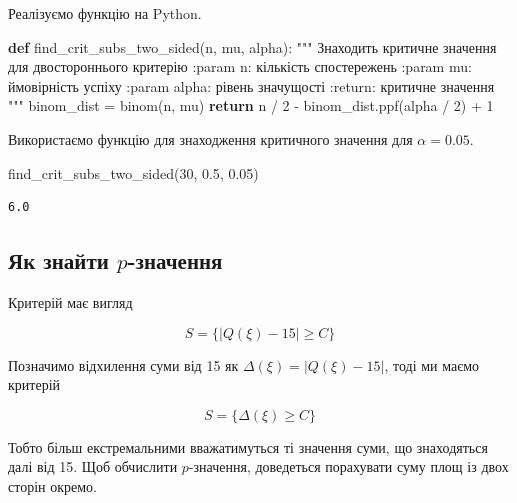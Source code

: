 \documentclass[
  letterpaper,
  10pt,
  openany]{report}
\newenvironment{Shaded}{\begin{snugshade}}{\end{snugshade}}
\newcommand{\CommentTok}[1]{\textcolor[rgb]{0.37,0.37,0.37}{#1}}
\newcommand{\ControlFlowTok}[1]{\textcolor[rgb]{0.00,0.23,0.31}{\textbf{#1}}}
\newcommand{\DecValTok}[1]{\textcolor[rgb]{0.68,0.00,0.00}{#1}}
\newcommand{\FloatTok}[1]{\textcolor[rgb]{0.68,0.00,0.00}{#1}}
\newcommand{\KeywordTok}[1]{\textcolor[rgb]{0.00,0.23,0.31}{\textbf{#1}}}
\newcommand{\NormalTok}[1]{\textcolor[rgb]{0.00,0.23,0.31}{#1}}
\newcommand{\OperatorTok}[1]{\textcolor[rgb]{0.37,0.37,0.37}{#1}}
\theoremstyle{definition}
\theoremstyle{remark}
\begin{document}
Реалізуємо функцію на Python.

\begin{Shaded}
\begin{Highlighting}[]
\KeywordTok{def}\NormalTok{ find\_crit\_subs\_two\_sided(n, mu, alpha):}
    \CommentTok{"""}
\CommentTok{    Знаходить критичне значення для двостороннього критерію}
\CommentTok{    :param n: кількість спостережень}
\CommentTok{    :param mu: ймовірність успіху}
\CommentTok{    :param alpha: рівень значущості}
\CommentTok{    :return: критичне значення}
\CommentTok{    """}
\NormalTok{    binom\_dist }\OperatorTok{=}\NormalTok{ binom(n, mu)}
    \ControlFlowTok{return}\NormalTok{ n }\OperatorTok{/} \DecValTok{2} \OperatorTok{{-}}\NormalTok{ binom\_dist.ppf(alpha }\OperatorTok{/} \DecValTok{2}\NormalTok{) }\OperatorTok{+} \DecValTok{1}
\end{Highlighting}
\end{Shaded}

Використаємо функцію для знаходження критичного значення для
\(\alpha = 0.05\).

\begin{Shaded}
\begin{Highlighting}[]
\NormalTok{find\_crit\_subs\_two\_sided(}\DecValTok{30}\NormalTok{, }\FloatTok{0.5}\NormalTok{, }\FloatTok{0.05}\NormalTok{)}
\end{Highlighting}
\end{Shaded}

\begin{verbatim}
6.0
\end{verbatim}

\subsection{\texorpdfstring{Як знайти
\(p\)-значення}{Як знайти p-значення}}\label{ux44fux43a-ux437ux43dux430ux439ux442ux438-p-ux437ux43dux430ux447ux435ux43dux43dux44f}

Критерій має вигляд

\[
S = \{|Q(\xi) - 15| \geqslant C\}
\]

Позначимо відхилення суми від 15 як \(\Delta(\xi) = |Q(\xi) - 15|\),
тоді ми маємо критерій

\[
S = \{\Delta(\xi) \geqslant C\}
\]

Тобто більш екстремальними вважатимуться ті значення суми, що
знаходяться далі від 15. Щоб обчислити \(p\)-значення, доведеться
порахувати суму площ із двох сторін окремо.
\end{document}
